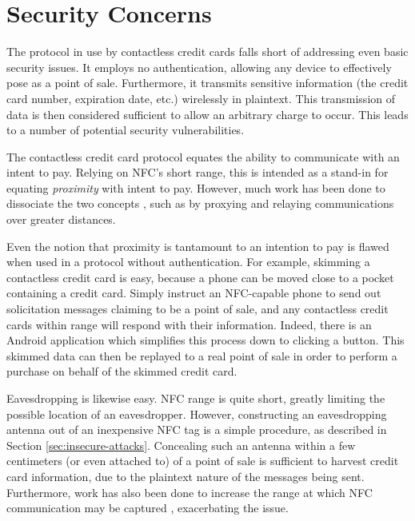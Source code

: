 \section{Security Concerns}
\label{sec:intro-security}

The protocol in use by contactless credit cards falls short of addressing even basic security issues.
It employs no authentication, allowing any device to effectively pose as a point of sale.
Furthermore, it transmits sensitive information (the credit card number, expiration date, etc.) wirelessly in plaintext.
This transmission of data is then considered sufficient to allow an arbitrary charge to occur.
This leads to a number of potential security vulnerabilities.

The contactless credit card protocol equates the ability to communicate with an intent to pay.
Relying on NFC's short range, this is intended as a stand-in for equating \emph{proximity} with intent to pay.
However, much work has been done to dissociate the two concepts \cite{brown2013evaluating, Drimer:2007:KYE:1362903.1362910, francis2010practical, hancke2005practical, markantonakis2012practical}, such as by proxying and relaying communications over greater distances.

Even the notion that proximity is tantamount to an intention to pay is flawed when used in a protocol without authentication.
For example, skimming a contactless credit card is easy, because a phone can be moved close to a pocket containing a credit card.
Simply instruct an NFC-capable phone to send out solicitation messages claiming to be a point of sale, and any contactless credit cards within range will respond with their information.
Indeed, there is an Android application \cite{NFCProxy} which simplifies this process down to clicking a button.
This skimmed data can then be replayed to a real point of sale in order to perform a purchase on behalf of the skimmed credit card.

Eavesdropping is likewise easy.
NFC range is quite short, greatly limiting the possible location of an eavesdropper.
However, constructing an eavesdropping antenna out of an inexpensive NFC tag is a simple procedure, as described in Section \ref{sec:insecure-attacks}.
Concealing such an antenna within a few centimeters (or even attached to) of a point of sale is sufficient to harvest credit card information,
    due to the plaintext nature of the messages being sent.
Furthermore, work has also been done to increase the range at which NFC communication may be captured \cite{brown2013evaluating, kfir2005picking},
    exacerbating the issue.

